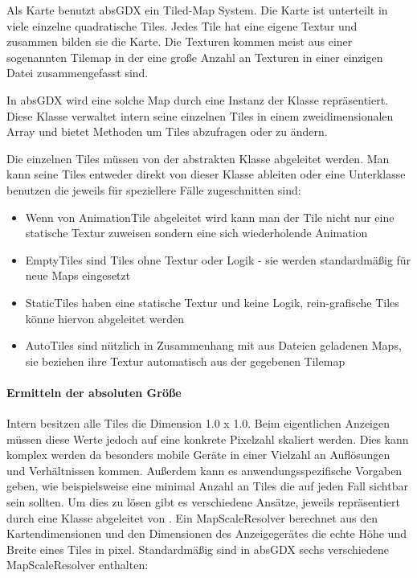 Als Karte benutzt absGDX ein Tiled-Map System. Die Karte ist unterteilt in viele einzelne quadratische Tiles.
Jedes Tile hat eine eigene Textur und zusammen bilden sie die Karte. Die Texturen kommen meist aus einer sogenannten Tilemap in der eine große Anzahl an Texturen in einer einzigen Datei zusammengefasst sind.


In absGDX wird eine solche Map durch eine Instanz der Klasse  repräsentiert. Diese Klasse verwaltet intern seine einzelnen Tiles in einem zweidimensionalen Array und bietet Methoden um Tiles abzufragen oder zu ändern.

Die einzelnen Tiles müssen von der abstrakten Klasse  abgeleitet werden. Man kann seine Tiles entweder direkt von dieser Klasse ableiten oder eine Unterklasse benutzen die jeweils für speziellere Fälle zugeschnitten sind:

\begin{itemize}
  \item {} Wenn von AnimationTile abgeleitet wird kann man der Tile nicht nur eine statische Textur zuweisen sondern eine sich wiederholende Animation
  \item {} EmptyTiles sind Tiles ohne Textur oder Logik - sie werden standardmäßig für neue Maps eingesetzt
  \item {} StaticTiles haben eine statische Textur und	keine Logik, rein-grafische Tiles könne hiervon abgeleitet werden
  \item {} AutoTiles sind nützlich in Zusammenhang mit aus Dateien geladenen Maps, sie beziehen ihre Textur automatisch aus der gegebenen Tilemap
\end{itemize}

\paragraph{Ermitteln der absoluten Größe}

Intern besitzen alle Tiles die Dimension 1.0 x 1.0. Beim eigentlichen Anzeigen müssen diese Werte jedoch auf eine konkrete Pixelzahl skaliert werden. Dies kann komplex werden da besonders mobile Geräte in einer Vielzahl an Auflösungen und Verhältnissen kommen. Außerdem kann es anwendungsspezifische Vorgaben geben, wie beispielsweise eine minimal Anzahl an Tiles die auf jeden Fall sichtbar sein sollten.
Um dies zu lösen gibt es verschiedene Ansätze, jeweils repräsentiert durch eine Klasse abgeleitet von .
Ein MapScaleResolver berechnet aus den Kartendimensionen und den Dimensionen des Anzeigegerätes die echte Höhe und Breite eines Tiles in pixel.
Standardmäßig sind in absGDX sechs verschiedene MapScaleResolver enthalten:

